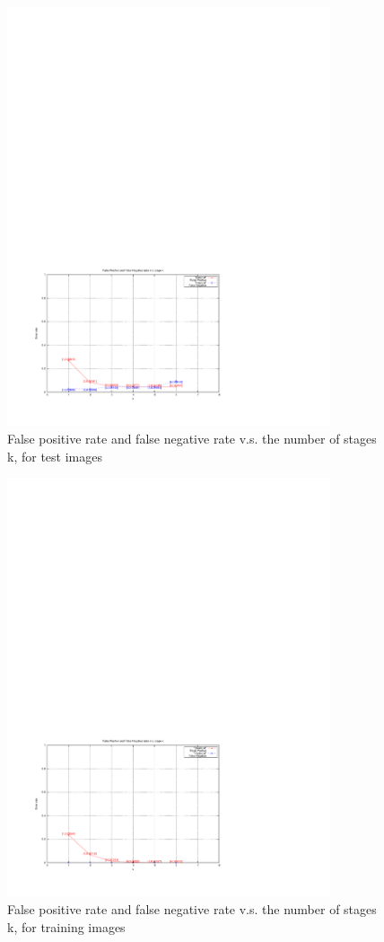 \documentclass[12pt]{article}
\begin{document}
\begin{figure}[!h]
\centering
\includegraphics[width=0.85\textwidth]{fpfn_test}
\caption{False positive rate and false negative rate v.s. the number of stages k, for test images \label{figtest}}
\end{figure}
\begin{figure}[!h]
\centering
\includegraphics[width=0.85\textwidth]{fpfn_train}
\caption{False positive rate and false negative rate v.s. the number of stages k, for training images\label{figtrain}}
\end{figure}
\end{document}
